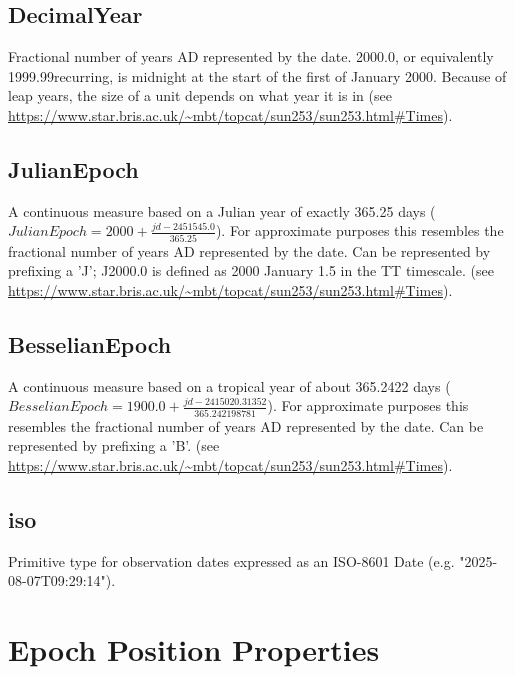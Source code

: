   \subsection{DecimalYear}
    \label{sect:DecimalYear}
    Fractional number of years AD represented by the date. 2000.0, or equivalently 1999.99recurring, is midnight at the start of the first of January 2000. Because of leap years, the size of a unit depends on what year it is in (see \url{https://www.star.bris.ac.uk/~mbt/topcat/sun253/sun253.html#Times}).

  \subsection{JulianEpoch}
    \label{sect:JulianEpoch}
    A continuous measure based on a Julian year of exactly 365.25 days ($JulianEpoch = 2000 + \frac{jd - 2451545.0}{365.25}$). For approximate purposes this resembles the fractional number of years AD represented by the date. Can be represented by prefixing a 'J'; J2000.0 is defined as 2000 January 1.5 in the TT timescale. (see \url{https://www.star.bris.ac.uk/~mbt/topcat/sun253/sun253.html#Times}).

  \subsection{BesselianEpoch}
    \label{sect:BesselianEpoch}
    A continuous measure based on a tropical year of about 365.2422 days ($BesselianEpoch = 1900.0 + \frac{jd - 2415020.31352}{365.242198781}$). For approximate purposes this resembles the fractional number of years AD represented by the date. Can be represented by prefixing a 'B'. (see \url{https://www.star.bris.ac.uk/~mbt/topcat/sun253/sun253.html#Times}).

  \subsection{iso}
    \label{sect:iso}
    Primitive type for observation dates expressed as an ISO-8601 Date (e.g. "2025-08-07T09:29:14").

\section{Epoch Position Properties}

